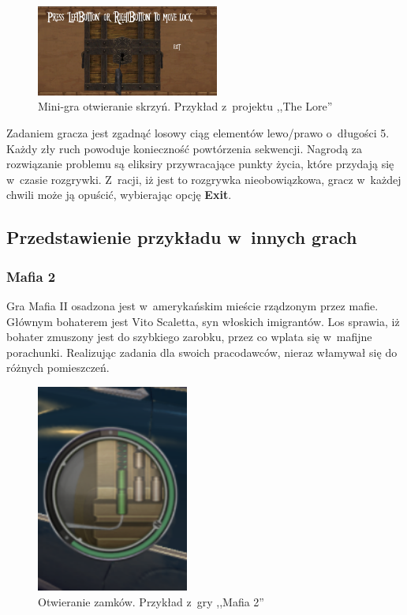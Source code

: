 \documentclass[oneside,polski,logo]{amuthesis}
\begin{document}
\begin{figure}[h]
	\centering
	\includegraphics[width=6cm]{images/tyrek/minigraskrzynia.png}
	\caption{Mini-gra otwieranie skrzyń. Przykład z~projektu ,,The Lore''}
\end{figure}

Zadaniem gracza jest zgadnąć losowy ciąg elementów lewo/prawo o~długości 5. Każdy zły ruch powoduje konieczność powtórzenia sekwencji. Nagrodą za rozwiązanie problemu są eliksiry przywracające punkty życia, które przydają się w~czasie rozgrywki. Z~racji, iż jest to rozgrywka nieobowiązkowa, gracz w~każdej chwili może ją opuścić, wybierając opcję \textbf{Exit}.
\subsection{Przedstawienie przykładu w~innych grach}
\subsubsection{Mafia 2}
\par Gra Mafia II osadzona jest w~amerykańskim mieście rządzonym przez mafie. Głównym bohaterem jest Vito Scaletta, syn włoskich imigrantów. Los sprawia, iż bohater zmuszony jest do szybkiego zarobku, przez co wplata się w~mafijne porachunki. Realizując zadania dla swoich pracodawców, nieraz włamywał się do różnych pomieszczeń. 

\begin{figure}[h!]
	\centering
	\includegraphics[width=5cm]{images/tyrek/Mafia2.png}
	\caption{Otwieranie zamków. Przykład z~gry ,,Mafia 2''}
\end{figure}
\end{document}
